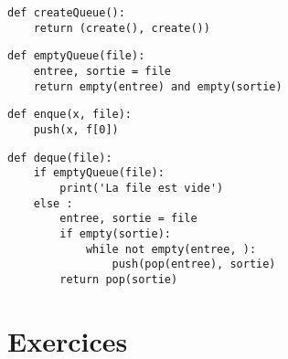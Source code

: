 \begin{Answer}
\begin{lstlisting}
def createQueue():
    return (create(), create())
\end{lstlisting}

\begin{lstlisting}
def emptyQueue(file):
    entree, sortie = file
    return empty(entree) and empty(sortie)
\end{lstlisting}

\begin{lstlisting}
def enque(x, file):
    push(x, f[0])\end{lstlisting}

\begin{lstlisting}
def deque(file):
    if emptyQueue(file):
        print('La file est vide')
    else :
        entree, sortie = file
        if empty(sortie):
            while not empty(entree, ):
                push(pop(entree), sortie) 
        return pop(sortie)
\end{lstlisting}
\end{Answer}
\newpage
\section{Exercices}

